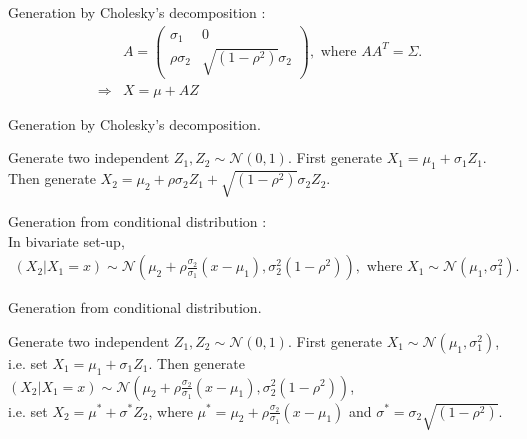 \documentclass[11pt]{article}
\begin{document}
Generation by Cholesky's decomposition :
\begin{align*}
	& A = \begin{pmatrix}\sigma_{1} & 0\\\rho\sigma_{2} & \sqrt{(1 - \rho^2)}\sigma_{2}\end{pmatrix}, \text{ where } AA^{T} = \Sigma.\nonumber\\
	\Rightarrow & X = \mu + AZ\nonumber
\end{align*}
\begin{algorithm}[H]
\caption{Generation by Cholesky's decomposition.}
\begin{algorithmic}[1]
\STATE Generate two independent $Z_1, Z_2 \sim \mathcal{N}(0,1)$.
\STATE First generate $X_1 = \mu_1 + \sigma_{1}Z_1$.
\STATE Then generate $X_2 = \mu_2 + \rho\sigma_{2}Z_1 + \sqrt{(1 - \rho^2)}\sigma_{2}Z_{2}$.
\end{algorithmic}
\end{algorithm}
Generation from conditional distribution :\\
In bivariate set-up,
\begin{align*}
	(X_2 | X_1 = x) \sim \mathcal{N}(\mu_2 + \rho\frac{\sigma_2}{\sigma_1}(x - \mu_1),\sigma_{2}^{2}(1 - \rho^2)), \text{ where } X_1 \sim \mathcal{N}(\mu_1,\sigma_{1}^{2}).\nonumber
\end{align*}
\begin{algorithm}[H]
\caption{Generation from conditional distribution.}
\begin{algorithmic}[1]
\STATE Generate two independent $Z_1, Z_2 \sim \mathcal{N}(0,1)$.
\STATE First generate $X_1 \sim \mathcal{N}(\mu_1,\sigma_{1}^{2})$,\\
	i.e. set $X_1 = \mu_1 + \sigma_{1}Z_1$.
\STATE Then generate $(X_2 | X_1 = x) \sim \mathcal{N}(\mu_2 + \rho\frac{\sigma_2}{\sigma_1}(x - \mu_1),\sigma_{2}^{2}(1 - \rho^2))$,\\
	i.e. set $X_2 = \mu^{*} + \sigma^{*}Z_2$, where $\mu^{*} = \mu_2 + \rho\frac{\sigma_2}{\sigma_1}(x - \mu_1)$ and $\sigma^{*} = \sigma_{2}\sqrt{(1 - \rho^2)}$.
\end{algorithmic}
\end{algorithm}
\newpage
{}
\end{document}

